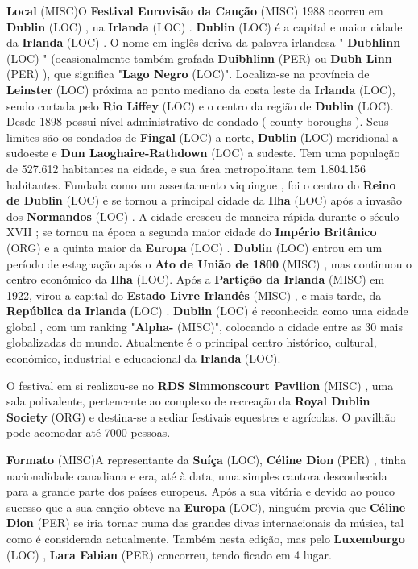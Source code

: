 \documentclass[12pt,a4paper]{article}
\begin{document}
\textbf{Local} (MISC)O \textbf{Festival Eurovisão da Canção} (MISC) 1988 ocorreu em \textbf{Dublin} (LOC) , na \textbf{Irlanda} (LOC) . \textbf{Dublin} (LOC) é a capital e maior cidade da \textbf{Irlanda} (LOC) . O nome em inglês deriva da palavra irlandesa " \textbf{Dubhlinn} (LOC) " (ocasionalmente também grafada \textbf{Duibhlinn} (PER) ou \textbf{Dubh Linn} (PER) ), que significa "\textbf{Lago Negro} (LOC)". Localiza-se na província de \textbf{Leinster} (LOC) próxima ao ponto mediano da costa leste da \textbf{Irlanda} (LOC), sendo cortada pelo \textbf{Rio Liffey} (LOC) e o centro da região de \textbf{Dublin} (LOC). Desde 1898 possui nível administrativo de condado ( county-boroughs ). Seus limites são os condados de \textbf{Fingal} (LOC) a norte, \textbf{Dublin} (LOC) meridional a sudoeste e \textbf{Dun Laoghaire-Rathdown} (LOC) a sudeste. Tem uma população de 527.612 habitantes na cidade, e sua área metropolitana tem 1.804.156 habitantes. Fundada como um assentamento viquingue , foi o centro do \textbf{Reino de Dublin} (LOC) e se tornou a principal cidade da \textbf{Ilha} (LOC) após a invasão dos \textbf{Normandos} (LOC) . A cidade cresceu de maneira rápida durante o século XVII ; se tornou na época a segunda maior cidade do \textbf{Império Britânico} (ORG) e a quinta maior da \textbf{Europa} (LOC) . \textbf{Dublin} (LOC) entrou em um período de estagnação após o \textbf{Ato de União de 1800} (MISC) , mas continuou o centro económico da \textbf{Ilha} (LOC). Após a \textbf{Partição da Irlanda} (MISC) em 1922, virou a capital do \textbf{Estado Livre Irlandês} (MISC) , e mais tarde, da \textbf{República da Irlanda} (LOC) . \textbf{Dublin} (LOC) é reconhecida como uma cidade global , com um ranking "\textbf{Alpha-} (MISC)", colocando a cidade entre as 30 mais globalizadas do mundo. Atualmente é o principal centro histórico, cultural, económico, industrial e educacional da \textbf{Irlanda} (LOC).

O festival em si realizou-se no \textbf{RDS Simmonscourt Pavilion} (MISC) , uma sala polivalente, pertencente ao complexo de recreação da \textbf{Royal Dublin Society} (ORG) e destina-se a sediar festivais equestres e agrícolas. O pavilhão pode acomodar até 7000 pessoas.



\textbf{Formato} (MISC)A representante da \textbf{Suíça} (LOC), \textbf{Céline Dion} (PER) , tinha nacionalidade canadiana e era, até à data, uma simples cantora desconhecida para a grande parte dos países europeus. Após a sua vitória e devido ao pouco sucesso que a sua canção obteve na \textbf{Europa} (LOC), ninguém previa que \textbf{Céline Dion} (PER) se iria tornar numa das grandes divas internacionais da música, tal como é considerada actualmente. Também nesta edição, mas pelo \textbf{Luxemburgo} (LOC) , \textbf{Lara Fabian} (PER) concorreu, tendo ficado em 4 lugar.
\end{document}
